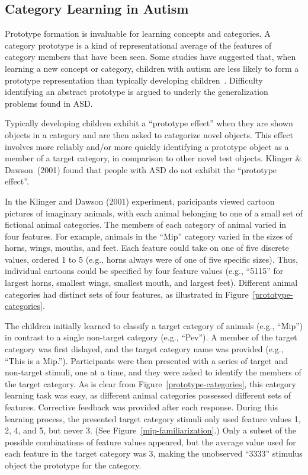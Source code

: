 %
%

\subsection{Category Learning in Autism}
Prototype formation is invaluable for learning concepts and categories. A category prototype is a kind of representational average of the features of category members that have been seen. Some studies have suggested that, when learning a new concept or category, children with autism are less likely to form a prototype representation than typically developing children~\cite{KlingerLG:2001:Prototype,GastgebHZ:2009:Prototype}. Difficulty identifying an abstract prototype is argued to underly the generalization problems found in ASD.

Typically developing children exhibit a ``prototype effect'' when they are shown objects in a category and are then asked to categorize novel objects. This effect involves more reliably and/or more quickly identifying a prototype object as a member of a target category, in comparison to other novel test objects. Klinger \& Dawson~(2001) \nocite{KlingerLG:2001:Prototype} found that people with ASD do not exhibit the ``prototype effect''.

In the Klinger and Dawson (2001) experiment, paricipants viewed cartoon pictures of imaginary animals, with each animal belonging to one of a small set of fictional animal categories. The members of each category of animal varied in four features. For example, animals in the ``Mip'' category varied in the sizes of horns, wings, mouths, and feet. Each feature could take on one of five discrete values, ordered 1 to 5 (e.g., horns always were of one of five specific sizes). Thus, individual cartoons could be specified by four feature values (e.g., ``5115'' for largest horns, smallest wings, smallest mouth, and largest feet). Different animal categories had distinct sets of four features, as illustrated in Figure~\ref{prototype-categories}.

The children initially learned to classify a target category of animals (e.g., ``Mip'') in contrast to a single non-target category (e.g., ``Pev''). A member of the target category was first dislayed, and the target category name was provided (e.g., ``This is a Mip.''). Participants were then presented with a series of target and non-target stimuli, one at a time, and they were asked to identify the members of the target category. As is clear from Figure~\ref{prototype-categories}, this category learning task was easy, as different animal categories possessed different sets of features. Corrective feedback was provided after each response. During this learning process, the presented target category stimuli only used feature values 1, 2, 4, and 5, but never 3. (See Figure~\ref{mip-familiarization}.) Only a subset of the possible combinations of feature values appeared, but the average value used for each feature in the target category was 3, making the unobserved ``3333'' stimulus object the prototype for the category.


